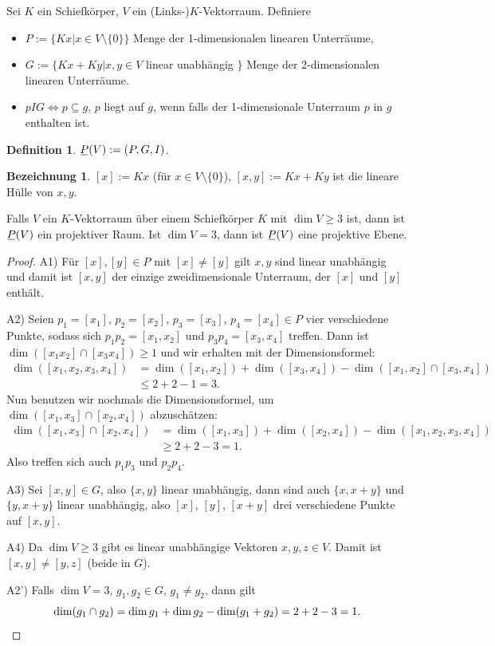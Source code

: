 \documentclass[
 a4paper,
 12pt,
 parskip=half
 ]{scrartcl}
\theoremstyle{plain}
\theoremstyle{definition}
\newtheorem*{defn*}{Definition}
\newtheorem*{deno*}{Bezeichnung}
\begin{document}
Sei $K$ ein Schiefkörper, $V$ ein (Links-)$K$-Vektorraum. Definiere
\begin{itemize}
 \item $P := \{ Kx | x \in V \setminus \{ 0 \} \}$ Menge der 1-dimensionalen linearen Unterräume,
 \item $G := \{ Kx + Ky | x, y \in V $ linear unabhängig $\}$ Menge der 2-dimensionalen linearen Unterräume.
 \item $p I G \Leftrightarrow p \subseteq g$, $p$ liegt auf $g$, wenn falls der 1-dimensionale Unterraum $p$ in $g$ enthalten ist.
\end{itemize}

\begin{defn*}
 $\proj(V) := (P,G,I)$.
\end{defn*}

\begin{deno*}
 $[x] := Kx$ (für $x \in V \setminus \{ 0 \}$), $[x,y] := Kx + Ky$ ist die lineare Hülle von $x,y$.
\end{deno*}

\begin{thm}
 Falls $V$ ein $K$-Vektorraum über einem Schiefkörper $K$ mit $\dim V \ge 3$ ist, dann ist $\proj(V)$ ein projektiver Raum. Ist $\dim V = 3$, dann ist $\proj(V)$ eine projektive Ebene.
\end{thm}

\begin{proof}
 A1) Für $[x], [y] \in P$ mit $[x] \ne [y]$ gilt $x,y$ sind linear unabhängig und damit ist $[x,y]$ der einzige zweidimensionale Unterraum, der $[x]$ und $[y]$ enthält.
 
 A2) Seien $p_1 = [x_1]$, $p_2 = [x_2]$, $p_3 = [x_3]$, $p_4 = [x_4] \in P$ vier verschiedene Punkte, sodass sich $p_1 p_2 = [x_1, x_2]$ und $p_3 p_4 = [x_3, x_4]$ treffen. Dann ist $\dim ( [x_1 x_2] \cap [x_3 x_4] ) \ge 1$ und wir erhalten mit der Dimensionsformel:
 \begin{align*}
  \dim( [x_1, x_2, x_3, x_4]) &= \dim( [x_1, x_2] ) + \dim( [x_3, x_4] ) - \dim( [x_1,x_2] \cap [x_3,x_4] ) \\
  &\le 2+2-1 = 3.
 \end{align*}
 Nun benutzen wir nochmals die Dimensionsformel, um $\dim( [x_1,x_3] \cap [x_2,x_4] )$ abzuschätzen:
 \begin{align*}
  \dim( [x_1,x_3] \cap [x_2,x_4] ) &= \dim( [x_1, x_3] ) + \dim( [x_2, x_4] ) - \dim( [x_1, x_2, x_3, x_4]) \\
  &\ge 2 + 2 - 3 = 1.
 \end{align*}
 Also treffen sich auch $p_1 p_3$ und $p_2 p_4$.
 
 A3) Sei $[x,y] \in G$, also $\{ x,y \}$ linear unabhängig, dann sind auch $\{ x, x+y \}$ und $\{ y, x+y \}$ linear unabhängig, also $[x]$, $[y]$, $[x+y]$ drei verschiedene Punkte auf $[x,y]$.
 
 A4) Da $\dim V \ge 3$ gibt es linear unabhängige Vektoren $x,y,z \in V$. Damit ist $[x,y] \ne [y,z]$ (beide in $G$).
 
 A2') Falls $\dim V = 3$, $g_1, g_2 \in G$, $g_1 \ne g_2$, dann gilt 
 \[ \dim( g_1 \cap g_2 ) = \dim g_1 + \dim g_2 - \dim( g_1 + g_2 ) = 2 + 2 - 3 = 1. \qedhere \]
\end{proof}
\end{document}
